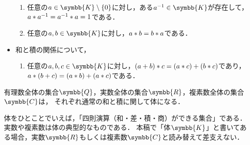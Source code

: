 \documentclass[../sotsu.tex]{subfiles}
\begin{document}
\begin{definition}[体]
\begin{itemize}
\begin{enumerate}[resume]
            \item \label{field:prod-reciprocal} 任意の$a \in \symbb{K} \setminus \{0\}$に対し，ある$a^{-1} \in \symbb{K}$が存在して，$a \mathbin{\ast} a^{-1} = a^{-1} \mathbin{\ast} a = 1$である．
            \item \label{field:prod-commutative} 任意の$a, b \in \symbb{K}$に対し，$a \mathbin{\ast} b = b \mathbin{\ast} a$である．
        \end{enumerate}
        \item 和と積の関係について，
        \begin{enumerate}[resume]
            \item \label{field:distributive} 任意の$a, b, c \in \symbb{K}$に対し，$(a + b) \mathbin{\ast} c = (a \mathbin{\ast} c) + (b \mathbin{\ast} c)$であり，$a \mathbin{\ast} (b + c) = (a \mathbin{\ast} b) + (a \mathbin{\ast} c)$である．
        \end{enumerate}    
    \end{itemize}
\end{definition}

\begin{example}
    有理数全体の集合$\symbb{Q}$，実数全体の集合$\symbb{R}$，複素数全体の集合$\symbb{C}$は，
    それぞれ通常の和と積に関して体になる．
\end{example}

体をひとことでいえば，「四則演算（和・差・積・商）ができる集合」である．
実数や複素数は体の典型的なものである．
本稿で「体$\symbb{K}$」と書いてある場合，実数$\symbb{R}$もしくは複素数$\symbb{C}$と読み替えて差支えない．
\end{document}
